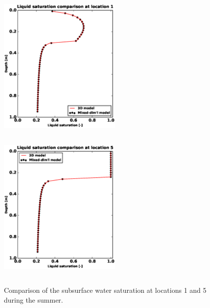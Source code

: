 \documentclass[review]{elsarticle}
\begin{document}
 \begin{figure}[!htpb]
\centering
\includegraphics[height = 7.5cm, width=6cm]{figures/comparison/regular/ss-sat/comp-sat-loc1-cycle0020.eps}
\includegraphics[height = 7.5cm, width=6cm]{figures/comparison/regular/ss-sat/comp-sat-loc5-cycle0020.eps}
\caption{Comparison of the subsurface water saturation at locations 1 and 5 during the summer.}
\label{ss-sat-comp}
\end{figure}
\end{document}
